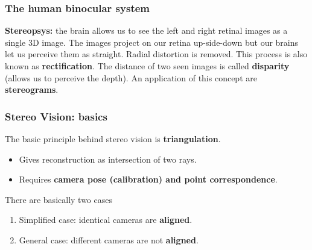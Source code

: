 \documentclass[a4paper,12 pt]{article}
\theoremstyle{definition}
\theoremstyle{remark}
\theoremstyle{definition}
\theoremstyle{definition}
\theoremstyle{definition}
\theoremstyle{remark}
\theoremstyle{definition}
\begin{document}
\subsubsection*{The human binocular system}
\textbf{Stereopsys:} the brain allows us to see the left and right retinal images as a single 3D image. The images project on our retina up-side-down but our brains let us perceive them as straight. Radial distortion is removed. This process is also known as \textbf{rectification}. The distance of two seen images is called \textbf{disparity} (allows us to perceive the depth). An application of this concept are \textbf{stereograms}.
\subsubsection*{Stereo Vision: basics}
The basic principle behind stereo vision is \textbf{triangulation}.
\begin{itemize}
\item Gives reconstruction as intersection of two rays.
\item Requires \textbf{camera pose (calibration) and point correspondence}.
\end{itemize}
There are basically two cases
\begin{enumerate}
\item Simplified case: identical cameras are \textbf{aligned}. 
\item General case: different cameras are not \textbf{aligned}.
\end{enumerate}
\end{document}
